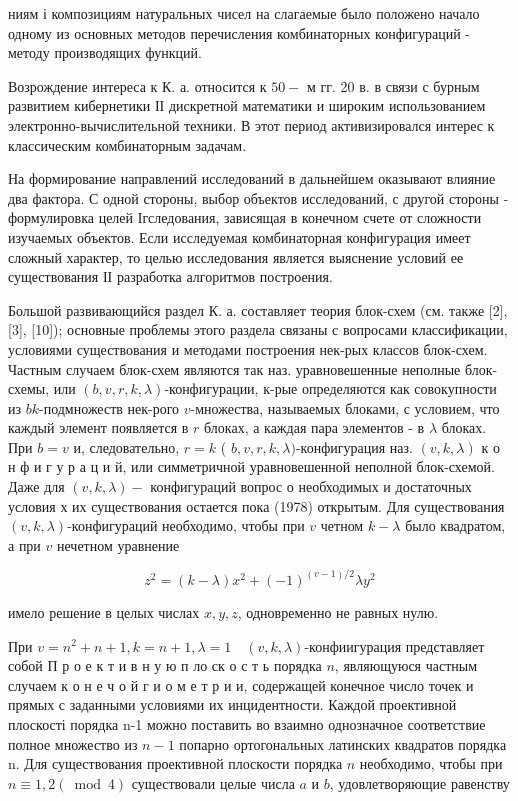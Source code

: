 \documentclass[10pt]{article}
\begin{document}
ниям і композициям натуральных чисел на слагаемые было положено начало одному из основных методов перечисления комбинаторных конфигураций - методу производящих функций.



Возрождение интереса к $К$. а. относится к $50-$ м гг. 20 в. в связи с бурным развитием кибернетики ІІ дискретной математики и широким использованием электронно-вычислительной техники. В этот период активизировался интерес к классическим комбинаторным задачам.



На формирование направлений исследований в дальнейшем оказывают влияние два фактора. С одной стороны, выбор объектов исследований, с другой стороны - формулировка целей Ігследования, зависящая в конечном счете от сложности изучаемых объектов. Если исследуемая комбинаторная конфигурация имеет сложный характер, то целью исследования является выяснение условий ее существования ІІ разработка алгоритмов построения.



Большой развивающийся раздел К. а. составляет теория блок-схем (см. также [2], [3], [10]); основные проблемы этого раздела связаны с вопросами классификации, условиями существования и методами построения нек-рых классов блок-схем. Частным случаем блок-схем являются так наз. уравновешенные неполные блок-схемы, или $(b, v, r, k, \lambda)$-конфигурации, к-рые определяются как совокупности из $b k$-подмножеств нек-рого $v$-множества, называемых блоками, с условием, что каждый элемент появляется в $r$ блоках, а каждая пара элементов - в $\lambda$ блоках. При $b=v$ и, следовательно, $r=k$ ( $b, v, r, k, \lambda)$-конфигурация наз. $(v, k, \lambda)$ к о н ф и г у р а ц и й, или симметричной уравновешенной неполной блок-схемой. Даже для $(v, k, \lambda)-$ конфигураций вопрос о необходимых и достаточных условия х их существования остается пока (1978) открытым. Для существования $(v, k, \lambda)$-конфигураций необходимо, чтобы при $v$ четном $k-\lambda$ было квадратом, а при $v$ нечетном уравнение



\[

z^{2}=(k-\lambda) x^{2}+(-1)^{(v-1) / 2} \lambda y^{2}

\]



имело решение в целых числах $x, y, z$, одновременно не равных нулю.



При $v=n^{2}+n+1, k=n+1, \lambda=1 \quad(v, k, \lambda)$-конфиигурация представляет собой П р о е к т и в н у ю п ло ск о с т ь порядка $n$, являющуюся частным случаем к о н е ч о й $г$ и о м е т р и и, содержащей конечное число точек и прямых с заданными условиями их инцидентности. Каждой проективной плоскості порядка n-1 можно поставить во взаимно однозначное соответствие полное множество из $n-1$ попарно ортогональных латинских квадратов порядка n. Для существования проективной плоскости порядка $n$ необходимо, чтобы при $n \equiv 1,2(\bmod 4)$ существовали целые числа $a$ и $b$, удовлетворяющие равенству
\end{document}
